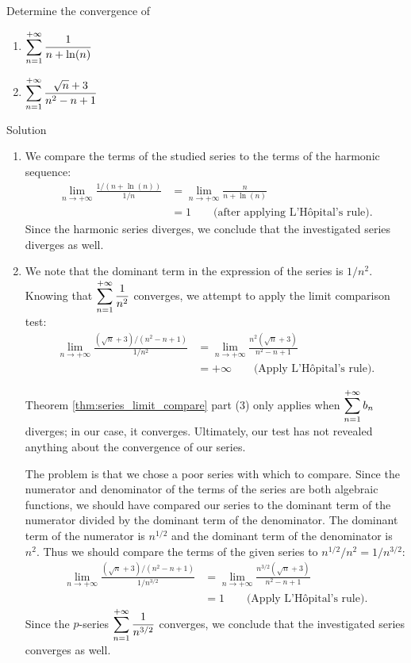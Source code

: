 \begin{example}\label{ex_lct1}
Determine the convergence of
\begin{multicols}{2}
\begin{enumerate}
\item $\displaystyle\sum_{n=1}^{+\infty} \frac1{n+\ln(n)}$
\item $\displaystyle\sum_{n=1}^{+\infty} \frac{\sqrt{n}+3}{n^2-n+1}$
\end{enumerate}
\end{multicols}

Solution 

\begin{enumerate}
\item We compare the terms of the studied series to the terms of the harmonic sequence:
\begin{align*}
\lim_{n\to+\infty}\frac{1/(n+\ln(n))}{1/n} &= \lim_{n\to+\infty} \frac{n}{n+\ln(n)} \\[0.2cm]
			&= 1\qquad \text{(after applying L'H\^opital's rule)}.
\end{align*}
Since the harmonic series diverges, we conclude that the investigated series diverges as well.
\item  We note that the dominant term in the expression of the series is $1/n^2$. Knowing that $\displaystyle \sum_{n=1}^{+\infty} \frac1{n^2}$ converges, we attempt to apply the limit comparison test:
\begin{align*}
\lim_{n\to+\infty}\frac{(\sqrt{n}+3)/(n^2-n+1)}{1/n^2} &= \lim_{n\to+\infty}\frac{n^2(\sqrt n+3)}{n^2-n+1}\\[0.2cm]
		&= +\infty \qquad \text{(Apply L'H\^opital's rule)}.
\end{align*}

Theorem \ref{thm:series_limit_compare} part (3) only applies when $\displaystyle\sum_{n=1}^{+\infty} b_n$ diverges; in our case, it converges. Ultimately, our test has not revealed anything about the convergence of our series.

The problem is that we chose a poor series with which to compare. Since the numerator and denominator of the terms of the series are both algebraic functions, we should have compared our series  to the dominant term of the numerator divided by the dominant term of the denominator. The dominant term of the numerator is $n^{1/2}$ and the dominant term of the denominator is $n^2$. Thus we should compare the terms of the given series to $n^{1/2}/n^2 = 1/n^{3/2}$:
\begin{align*}
\lim_{n\to+\infty}\frac{(\sqrt{n}+3)/(n^2-n+1)}{1/n^{3/2}} &= \lim_{n\to+\infty} \frac{n^{3/2}(\sqrt n+3)}{n^2-n+1} \\[0.2cm]
		&= 1\qquad \text{(Apply L'H\^opital's rule)}.
\end{align*}
Since the  $p$-series $\displaystyle\sum_{n=1}^{+\infty} \frac1{n^{3/2}}$ converges, we conclude that the investigated series converges as well.
\end{enumerate}
\end{example}


